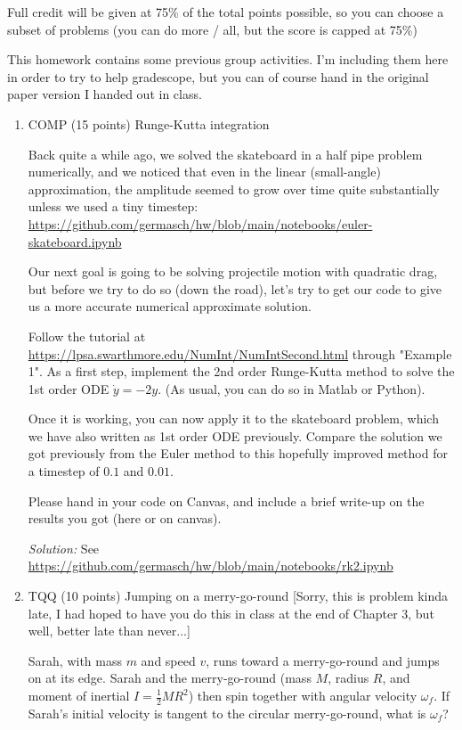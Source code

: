 \documentclass[12pt]{article}
\newcommand{\soln}[2] {\textit{Solution:} #2}
\begin{document}
Full credit will be given at 75\% of the total points possible, so you can choose a subset of problems (you can do more / all, but the score is capped at 75\%)

This homework contains some previous group activities. I'm including them here in order to try to help gradescope, but you can of course hand in the original paper version I handed out in class.

\clearpage

\begin{enumerate}

    \item COMP (15 points) Runge-Kutta integration

          Back quite a while ago, we solved the skateboard in a half pipe problem numerically, and we noticed that even in the linear (small-angle) approximation, the amplitude seemed to grow over time quite substantially unless we used a tiny timestep: \url{https://github.com/germasch/hw/blob/main/notebooks/euler-skateboard.ipynb}

          Our next goal is going to be solving projectile motion with quadratic drag, but before we try to do so (down the road), let's try to get our code to give us a more accurate numerical approximate solution.

          Follow the tutorial at \url{https://lpsa.swarthmore.edu/NumInt/NumIntSecond.html} through "Example 1". As a first step, implement the 2nd order Runge-Kutta method to solve the 1st order ODE $\dot y = -2 y$. (As usual, you can do so in Matlab or Python).

          Once it is working, you can now apply it to the skateboard problem, which we have also written as 1st order ODE previously. Compare the solution we got previously from the Euler method to this hopefully improved method for a timestep of $0.1$ and $0.01$.

          Please hand in your code on Canvas, and include a brief write-up on the results you got (here or on canvas).

          \soln{15em}{See \url{https://github.com/germasch/hw/blob/main/notebooks/rk2.ipynb}}

          \clearpage
    \item TQQ (10 points) Jumping on a merry-go-round [Sorry, this is problem kinda late, I had hoped to have you do this in class at the end of Chapter 3, but well, better late than never...]

          Sarah, with mass $m$ and speed $v$, runs toward a merry-go-round and jumps on at its edge. Sarah and the merry-go-round (mass $M$, radius $R$, and moment of inertial $I = \frac{1}{2}MR^2$) then spin together with angular velocity $\omega_f$. If Sarah's initial velocity is tangent to the circular merry-go-round, what is $\omega_f$?


\end{enumerate}
\end{document}
